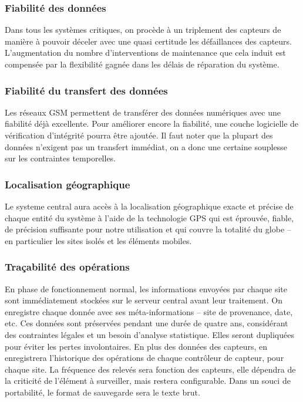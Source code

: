 \documentclass[a4paper, 11pt, draft]{article}
\begin{document}
\subsubsection{Fiabilité des données}

Dans tous les systèmes critiques, on procède à un triplement des capteurs de manière à pouvoir déceler avec une quasi certitude les défaillances des capteurs. L'augmentation du nombre d'interventions de maintenance que cela induit est compensée par la flexibilité gagnée dans les délais de réparation du système.

\subsubsection{Fiabilité du transfert des données}

Les réseaux GSM permettent de transférer des données numériques avec une fiabilité déjà excellente. Pour améliorer encore la fiabilité, une couche logicielle de vérification d'intégrité pourra être ajoutée. Il faut noter que la plupart des données n'exigent pas un transfert immédiat, on a donc une certaine souplesse sur les contraintes temporelles.

\subsubsection{Localisation géographique}

Le systeme central aura accès à la localisation géographique exacte et précise de chaque entité du système à l'aide de la technologie GPS qui est éprouvée, fiable, de précision suffisante pour notre utilisation et qui couvre la totalité du globe -- en particulier les sites isolés et les éléments mobiles.

\subsubsection{Traçabilité des opérations}

En phase de fonctionnement normal, les informations envoyées par chaque site sont immédiatement stockées sur le serveur central avant leur traitement. On enregistre chaque donnée avec ses méta-informations -- site de provenance, date, etc. Ces données sont préservées pendant une durée de quatre ans, considérant des contraintes légales et un besoin d'analyse statistique. Elles seront dupliquées pour éviter les pertes involontaires.
En plus des données des capteurs, en enregistrera l'historique des opérations de chaque contrôleur de capteur, pour chaque site. La fréquence des relevés sera fonction des capteurs, elle dépendra de la criticité de l'élément à surveiller, mais restera configurable.
Dans un souci de portabilité, le format de sauvegarde sera le texte brut.
\end{document}
